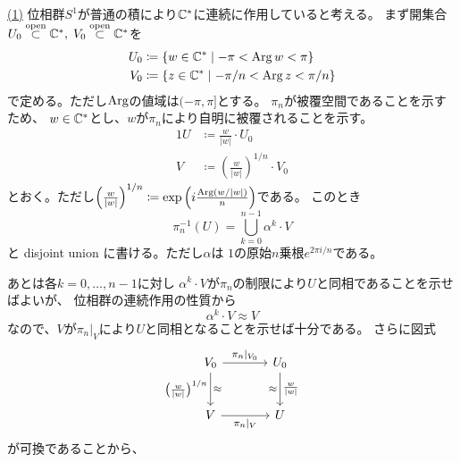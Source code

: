 \documentclass[report]{jlreq}
\begin{document}
\begin{answer}
    \uline{(1)} \quad
    位相群$S^1$が普通の積により$\mathbb{C}^*$に連続に作用していると考える。
    まず開集合$U_0 \stackrel{\text{open}}{\subset} \mathbb{C}^*, \; V_0 \stackrel{\text{open}}{\subset} \mathbb{C}^*$を
    \begin{alignat}{1}
        U_0 &\coloneqq \{ w \in \mathbb{C}^* \mid -\pi < \operatorname{Arg} w < \pi \} \\
        V_0 &\coloneqq \{ z \in \mathbb{C}^* \mid -\pi / n < \operatorname{Arg} z < \pi / n \}
    \end{alignat}
    で定める。ただし$\operatorname{Arg}$の値域は$(-\pi, \pi]$とする。
    $\pi_n$が被覆空間であることを示すため、
    $w \in \mathbb{C}^*$とし、$w$が$\pi_n$により自明に被覆されることを示す。
    \begin{alignat}{1}
        U &\coloneqq \frac{w}{|w|} \cdot U_0 \\
        V &\coloneqq \left(\frac{w}{|w|}\right)^{1/n} \cdot V_0
    \end{alignat}
    とおく。ただし$\left(\frac{w}{|w|}\right)^{1/n}
    \coloneqq \exp\left( i \frac{\operatorname{Arg} (w / |w|)}{n} \right)$である。
    このとき
    \begin{equation}
        \pi_n^{-1}(U) = \bigcup_{k = 0}^{n - 1} \alpha^k \cdot V
    \end{equation}
    と disjoint union に書ける。ただし$\alpha$は
    $1$の原始$n$乗根$e^{2\pi i / n}$である。
    \begin{innerproof}
        \TODO{}
    \end{innerproof}
    あとは各$k = 0, \dots, n - 1$に対し
    $\alpha^k \cdot V$が$\pi_n$の制限により$U$と同相であることを示せばよいが、
    位相群の連続作用の性質から
    \begin{equation}
        \alpha^k \cdot V \approx V
    \end{equation}
    なので、$V$が$\pi_n|_V$により$U$と同相となることを示せば十分である。
    さらに図式
    \begin{equation}
        \begin{tikzcd}[
            column sep=large,
            row sep=large,
            every label/.append style={font=\footnotesize}
        ]
            V_0
                \ar{d}[swap]{\left(\frac{w}{|w|}\right)^{1/n}}{\approx}
                \ar{r}{\pi_n|_{V_0}}
                & U_0
                \ar{d}{\frac{w}{|w|}}[swap]{\approx} \\
            V
                \ar{r}[swap]{\pi_n|_V}
                & U
        \end{tikzcd}
    \end{equation}
    が可換であることから、

\end{answer}
\end{document}
